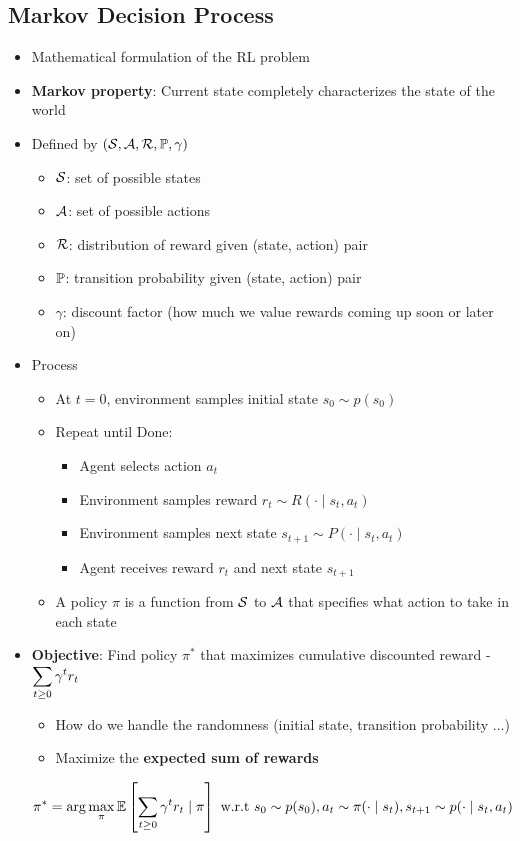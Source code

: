 \subsection{Markov Decision Process}
\begin{itemize}
	\item Mathematical formulation of the RL problem
	\item \textbf{Markov property}: Current state completely characterizes the state of the world
	\item Defined by $(\mathcal{S}, \mathcal{A}, \mathcal{R}, \mathbb{P}, \gamma)$
	\begin{itemize}
		\item $\mathcal{S}$: set of possible states
		\item $\mathcal{A}$: set of possible actions
		\item $ \mathcal{R} $: distribution of reward given (state, action) pair
		\item $ \mathbb{P} $: transition probability given (state, action) pair
		\item $ \gamma $: discount factor (how much we value rewards coming up soon or later on)
	\end{itemize}
	\item Process
	\begin{itemize}
		\item At $t=0$, environment samples initial state $s_0 \sim p(s_0)$
		\item Repeat until Done:
		\begin{itemize}
			\item Agent selects action $a_t$
			\item Environment samples reward $r_t \sim R(\cdot \mid s_t, a_t)$
			\item Environment samples next state $s_{t+1}\sim P(\cdot \mid s_t, a_t)$
			\item Agent receives reward $r_t$ and next state $s_{t+1}$
		\end{itemize}
		\item A policy $\pi$ is a function from $\mathcal{S}$ to $\mathcal{A}$ that specifies what action to take in each state
	\end{itemize}
	\item \textbf{Objective}: Find policy $\pi^\ast$ that maximizes cumulative discounted reward - $\displaystyle \sum_{t\geq 0} \gamma^t r_t$
	\begin{itemize}
		\item How do we handle the randomness (initial state, transition probability ...)
		\item Maximize the \textbf{expected sum of rewards}
	\end{itemize}
	$$\pi^\ast = \arg\max_\pi \mathbb{E}\left[\sum_{t\geq 0} \gamma^t r_t\mid \pi\right] \text{ w.r.t } s_0\sim p(s_0), a_t\sim \pi(\cdot \mid s_t), s_{t+1}\sim p(\cdot \mid s_t, a_t)$$
\end{itemize}

